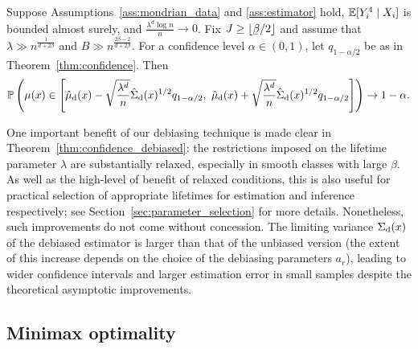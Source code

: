 \begin{theorem}%
  \label{thm:confidence_debiased}
  Suppose Assumptions~\ref{ass:mondrian_data} and \ref{ass:estimator} hold,
  $\mathbb{E}[Y_i^4 \mid X_i ]$ is bounded almost surely,
  and $\frac{\lambda^d \log n}{n} \to 0$.
  Fix $J \geq \lfloor \flbeta / 2 \rfloor$ and
  assume that
  $\lambda \gg n^{\frac{1}{d + 2 \beta}}$
  and $B \gg n^{\frac{2 \beta - 2}{d + 2 \beta}}$.
  For a confidence level $\alpha \in (0, 1)$,
  let $q_{1 - \alpha / 2}$ be as in Theorem~\ref{thm:confidence}.
  Then
  \begin{align*}
    \mathbb{P} \left(
      \mu(x) \in
      \left[
        \hat \mu_{\mathrm{d}}(x)
        - \sqrt{\frac{\lambda^d}{n}} \hat \Sigma_{\mathrm{d}}(x)^{1/2}
        q_{1 - \alpha / 2}, \
        \hat \mu_{\mathrm{d}}(x)
        + \sqrt{\frac{\lambda^d}{n}} \hat \Sigma_{\mathrm{d}}(x)^{1/2}
        q_{1 - \alpha / 2}
      \right]
    \right)
    \to
    1 - \alpha.
  \end{align*}

\end{theorem}

One important benefit of our debiasing technique is made clear in
Theorem~\ref{thm:confidence_debiased}: the restrictions imposed
on the lifetime parameter $\lambda$ are substantially relaxed,
especially in smooth classes with large $\beta$.
As well as the high-level of benefit of relaxed conditions,
this is also useful for practical selection of appropriate lifetimes
for estimation and inference respectively;
see Section~\ref{sec:parameter_selection} for more details.
Nonetheless, such improvements do not come without concession.
The limiting variance $\Sigma_{\mathrm{d}}(x)$ of the debiased estimator
is larger than that of the unbiased version
(the extent of this increase depends on the choice of the
debiasing parameters $a_r$),
leading to wider confidence intervals and larger estimation error in
small samples despite the theoretical asymptotic improvements.

\subsection{Minimax optimality}

